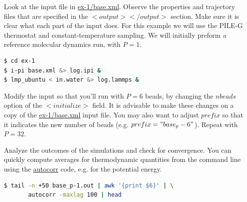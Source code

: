 \documentclass{article}
\begin{document}
\begin{Exercise}[label={basic},title={A PIMD simulation of liquid water}]

\Question 
Look at the \ipi{} input file in \url{ex-1/base.xml}. Observe the 
properties and trajectory files that are specified in the \lstinxml$<output></output>$ section. 
Make sure it is clear what each part 
of the input does. For this example
we will use the PILE-G thermostat\cite{ceri+11jcp} and 
constant-temperature sampling. We will 
initially preform a reference molecular dynamics run, with $P=1$. 

\begin{lstlisting}[language=bash]
$ cd ex-1 
$ i-pi base.xml &> log.ipi &
$ lmp_ubuntu < in.water &> log.lammps & 
\end{lstlisting}%

\Question
Modify the input so that you'll run with
$P=6$ beads, by changing the \lstinxml$nbeads$ option of the \lstinxml$<initialize>$ field. 
It is advisable to make these changes on a copy of the  \url{ex-1/base.xml} input file.
You may also want to adjust \lstinxml$prefix$ so that it indicates the new number of beads (e.g. \lstinxml$prefix="base_p-6"$).
Repeat with $P=32$. 

\Question
Analyze the outcomes of the simulations and check for convergence. 
You can quickly compute averages for thermodynamic quantities from the command
line using the \url{autocorr} code, e.g. for the potential energy. 

\begin{lstlisting}[language=bash]
$ tail -n +50 base_p-1.out | awk '{print $6}' | \
       autocorr -maxlag 100 | head
\end{lstlisting}


\end{Exercise}
\end{document}
